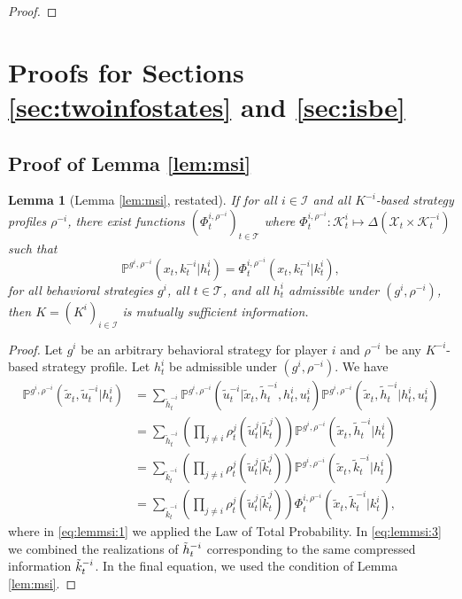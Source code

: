 \documentclass[pdflatex,sn-basic]{sn-jnl}
\renewcommand{\Pr}{\mathbb{P}}
\newcommand{\Comp}{K}
\newcommand{\comp}{k}
\newcommand{\Compset}{\mathcal{K}}
\theoremstyle{thmstyleone}%
\newtheorem{lemma}{Lemma}
\theoremstyle{thmstyletwo}%
\theoremstyle{thmstylethree}%
\begin{document}
\begin{appendices}
\begin{proof}
\end{proof}

\section{Proofs for Sections \ref{sec:twoinfostates} and \ref{sec:isbe}}\label{app:proofsmain}

\subsection{Proof of Lemma \ref{lem:msi}}\label{app:lem:msi}

\begin{lemma}[Lemma \ref{lem:msi}, restated]
	If for all $i\in\mathcal{I}$ and all $\Comp^{-i}$-based strategy profiles $\rho^{-i}$, there exist functions $(\Phi_t^{i, \rho^{-i}})_{t\in\mathcal{T}}$ where $\Phi_t^{i, \rho^{-i}}\colon\Compset_t^i \mapsto \Delta(\mathcal{X}_t\times \Compset_t^{-i})$ such that
	\begin{equation}
		\Pr^{g^i, \rho^{-i}}(x_t, \comp_t^{-i}|h_t^i) = \Phi_t^{i,\rho^{-i}}(x_t, \comp_t^{-i}|\comp_t^i),
	\end{equation}
	for all behavioral strategies $g^i$, all $t\in\mathcal{T}$, and all $h_t^i$ admissible under $(g^i, \rho^{-i})$, then $\Comp=(\Comp^i)_{i\in\mathcal{I}}$ is mutually sufficient information.
\end{lemma}

\begin{proof}

{Let $g^i$ be an arbitrary behavioral strategy for player $i$ and $\rho^{-i}$ be any $K^{-i}$-based strategy profile. Let $h_t^i$ be admissible under $(g^i, \rho^{-i})$.} We have	
\begin{align}
		\Pr^{g^i, \rho^{-i}}(\tilde{x}_t, \tilde{u}_t^{-i}|h_t^i) &= \sum_{\tilde{h}_t^{-i}} \Pr^{g^i, \rho^{-i}}(\tilde{u}_t^{-i}|\tilde{x}_t, \tilde{h}_t^{-i}, h_t^i, u_t^i)\Pr^{g^i, \rho^{-i}}(\tilde{x}_t, \tilde{h}_t^{-i}|h_t^i, u_t^i)\label{eq:lemmsi:1} \\
		&=\sum_{\tilde{h}_t^{-i}}\left(\prod_{j\neq i} \rho_t^{j}(\tilde{u}_t^j|\tilde{\comp}_t^j) \right)\Pr^{g^i, \rho^{-i}}(\tilde{x}_t, \tilde{h}_t^{-i}|h_t^i)\\
		&=\sum_{\tilde{\comp}_t^{-i}}\left(\prod_{j\neq i} \rho_t^{j}(\tilde{u}_t^j|\tilde{\comp}_t^j) \right)\Pr^{g^i, \rho^{-i}}(\tilde{x}_t, \tilde{\comp}_t^{-i}|h_t^i)\label{eq:lemmsi:3} \\
		&=\sum_{\tilde{\comp}_t^{-i}}\left( \prod_{j\neq i} \rho_t^{j}(\tilde{u}_t^j|\tilde{\comp}_t^j) \right)\Phi_t^{i, \rho^{-i}}(\tilde{x}_t, \tilde{\comp}_t^{-i}|\comp_t^i),\label{eq:lemmsi:4}
	\end{align}
    {where in \eqref{eq:lemmsi:1} we applied the Law of Total Probability. In \eqref{eq:lemmsi:3} we combined the realizations of $\Tilde{h}_t^{-i}$ corresponding to the same compressed information $\Tilde{k}_t^{-i}$. In the final equation, we used the condition of Lemma \ref{lem:msi}.}
 

\end{proof}
\end{appendices}
\end{document}
